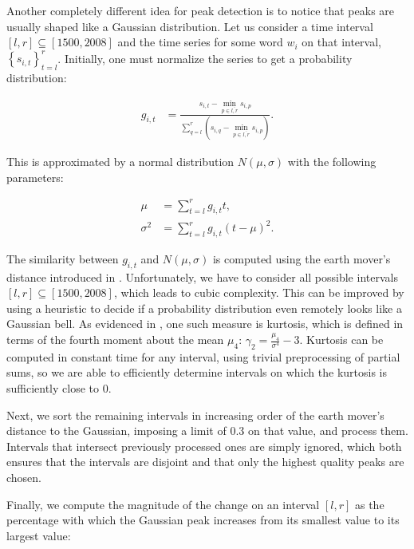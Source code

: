Another completely different idea for peak detection is to notice that peaks are usually shaped like a Gaussian distribution. Let us consider a time interval $\left[ l, r \right] \subseteq \left[ 1500, 2008 \right]$ and the time series for some word $w_i$ on that interval, $\left\{ s_{i, t} \right\}_{t=l}^{r}$. Initially, one must normalize the series to get a probability distribution:

\begin{align}
\label{eq:gaussian-normalization}
g_{i, t} &= \frac{s_{i, t} - \min_{p \in \overline{l, r}} s_{i, p}}{\sum_{q = l}^{r} \left( s_{i, q} - \min_{p \in \overline{l, r}} s_{i, p} \right)}.
\end{align}

This is approximated by a normal distribution $N \left( \mu, \sigma \right)$ with the following parameters:

\begin{align}
\label{eq:mu-gaussian-model}
\mu &= \sum_{t=l}^{r} g_{i, t} t, \\
\label{eq:sigma-gaussian-model}
\sigma^2 &= \sum_{t=l}^{r} g_{i, t} \left( t - \mu \right)^2.
\end{align}

The similarity between $g_{i, t}$ and $N \left( \mu, \sigma \right)$ is computed using the earth mover's distance introduced in . Unfortunately, we have to consider all possible intervals $\left[ l, r \right] \subseteq \left[ 1500, 2008 \right]$, which leads to cubic complexity. This can be improved by using a heuristic to decide if a probability distribution even remotely looks like a Gaussian bell. As evidenced in , one such measure is kurtosis, which is defined in terms of the fourth moment about the mean $\mu_4$: $\gamma_2 = \frac{\mu_4}{\sigma^4} - 3$. Kurtosis can be computed in constant time for any interval, using trivial preprocessing of partial sums, so we are able to efficiently determine intervals on which the kurtosis is sufficiently close to $0$.

Next, we sort the remaining intervals in increasing order of the earth mover's distance to the Gaussian, imposing a limit of $0.3$ on that value, and process them. Intervals that intersect previously processed ones are simply ignored, which both ensures that the intervals are disjoint and that only the highest quality peaks are chosen.

Finally, we compute the magnitude of the change on an interval $\left[ l, r \right]$ as the percentage with which the Gaussian peak increases from its smallest value to its largest value:


